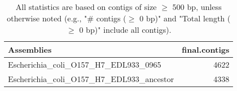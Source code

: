 \documentclass[12pt,a4paper]{article}
\begin{document}
\begin{table}[ht]
\begin{center}
\caption{All statistics are based on contigs of size $\geq$ 500 bp, unless otherwise noted (e.g., "\# contigs ($\geq$ 0 bp)" and "Total length ($\geq$ 0 bp)" include all contigs).}
\begin{tabular}{|l*{1}{|r}|}
\hline
Assemblies & final.contigs \\ \hline
Escherichia\_coli\_O157\_H7\_EDL933\_0965 & 4622 \\ \hline
Escherichia\_coli\_O157\_H7\_EDL933\_ancestor & 4338 \\ \hline
\end{tabular}
\end{center}
\end{table}
\end{document}
